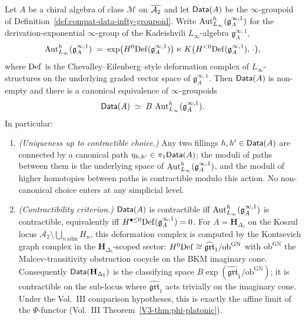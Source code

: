 \begin{theorem}
\label{thm:compat-data-torsor-uniqueness}
\ClaimStatusConditional{}%
%
Let $A$ be a chiral algebra of class $\mathcal M$ on $\overline{\mathcal{A}_2}$ and let
$\mathsf{Data}(A)$ be the $\infty$-groupoid of
Definition~\textup{\ref{def:compat-data-infty-groupoid}}. Write
$\operatorname{Aut}^h_{L_\infty}(\mathfrak g^{\infty,1}_A)$ for the
derivation-exponential $\infty$-group of the Kadeishvili $L_\infty$-algebra
$\mathfrak g^{\infty,1}_A$,
\[
\operatorname{Aut}^h_{L_\infty}(\mathfrak g^{\infty,1}_A)
\;=\;
\exp\bigl(H^0\mathrm{Def}(\mathfrak g^{\infty,1}_A)\bigr)
 \ltimes K\bigl(H^{<0}\mathrm{Def}(\mathfrak g^{\infty,1}_A),\,\cdot\bigr),
\]
where $\mathrm{Def}$ is the Chevalley--Eilenberg--style deformation complex of
$L_\infty$-structures on the underlying graded vector space of
$\mathfrak g^{\infty,1}_A$. Then $\mathsf{Data}(A)$ is non-empty and there is a
canonical equivalence of $\infty$-groupoids
\begin{equation}
\label{eq:data-equivalence-torsor}
\mathsf{Data}(A)\;\simeq\;
B\,\operatorname{Aut}^h_{L_\infty}(\mathfrak g^{\infty,1}_A).
\end{equation}
In particular:
\begin{enumerate}
\item \emph{(Uniqueness up to contractible choice.)} Any two fillings
$h,h'\in\mathsf{Data}(A)$ are connected by a canonical path
$\eta_{h,h'}\in\pi_1\mathsf{Data}(A)$; the moduli of paths between them is the
underlying space of $\operatorname{Aut}^h_{L_\infty}(\mathfrak g^{\infty,1}_A)$, and
the moduli of higher homotopies between paths is contractible modulo
this action. No non-canonical choice enters at any simplicial level.
\item \emph{(Contractibility criterion.)} $\mathsf{Data}(A)$ is contractible iff
$\operatorname{Aut}^h_{L_\infty}(\mathfrak g^{\infty,1}_A)$ is contractible, equivalently
iff $H^{\bullet\le 0}\mathrm{Def}(\mathfrak g^{\infty,1}_A) = 0$. For
$A = \mathbf H_{\Delta_5}$ on the Koszul locus
$\overline{\mathcal A_2}\setminus\bigcup_{n\,\mathrm{adm}}H_n$, this
deformation complex is computed by the Kontsevich graph complex in the
$\mathbf H_{\Delta_5}$-scoped sector: $H^0\mathrm{Def} \cong \widehat{\mathfrak{grt}}_1
/ \mathrm{ob}^{\mathrm{GN}}$ with $\mathrm{ob}^{\mathrm{GN}}$ the
Malcev-transitivity obstruction cocycle on the BKM imaginary cone.
Consequently $\mathsf{Data}(\mathbf H_{\Delta_5})$ is the classifying space
$B\exp(\widehat{\mathfrak{grt}}_1/\mathrm{ob}^{\mathrm{GN}})$; it is
contractible on the sub-locus where $\widehat{\mathfrak{grt}}_1$ acts
trivially on the imaginary cone. Under the Vol.~III comparison
hypotheses, this is exactly the affine limit of the $\Psi$-functor
(Vol.~III Theorem~\ref{V3-thm:phi-platonic}).
\end{enumerate}
\end{theorem}

